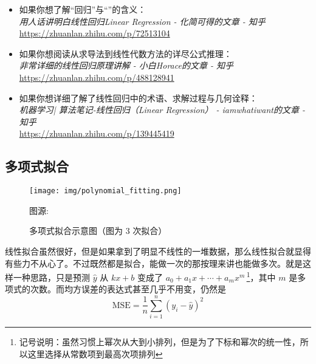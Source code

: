 \begin{tcolorbox}[myrecommendbox, title=推荐阅读, breakable=false]
    \begin{itemize}
        \item 如果你想了解“回归”与“”的含义：\\
              \textit{用人话讲明白线性回归Linear Regression - 化简可得的文章 - 知乎}\\
              \url{https://zhuanlan.zhihu.com/p/72513104}
        \item 如果你想阅读从求导法到线性代数方法的详尽公式推理：\\
              \textit{非常详细的线性回归原理讲解 - 小白Horace的文章 - 知乎}\\
              \url{https://zhuanlan.zhihu.com/p/488128941}
        \item 如果你想详细了解了线性回归中的术语、求解过程与几何诠释：\\
              \textit{机器学习| 算法笔记-线性回归（Linear Regression） - iamwhatiwant的文章 - 知乎}\\
              \url{https://zhuanlan.zhihu.com/p/139445419}
    \end{itemize}
\end{tcolorbox}

\newpage

\subsection{多项式拟合}

\begin{figure}[H]
    \centering
    \texttt{[image: img/polynomial\_fitting.png]}
    \caption{多项式拟合示意图（图为 3 次拟合）}
    {图源: }
    \label{fig:polynomial_fitting}
\end{figure}

线性拟合虽然很好，但是如果拿到了明显不线性的一堆数据，那么线性拟合就显得有些力不从心了。不过既然都是拟合，能做一次的那按理来讲也能做多次。就是这样一种思路，只是预测 $\hat y$ 从 $kx+b$ 变成了 $a_0 + a_1 x + \cdots + a_m x^m$\,\footnote{记号说明：虽然习惯上幂次从大到小排列，但是为了下标和幂次的统一性，所以这里选择从常数项到最高次项排列}，其中 $m$ 是多项式的次数。而均方误差的表达式甚至几乎不用变，仍然是
\[
    \text{MSE} = \frac1n \sum_{i=1}^n (y_i - \hat y)^2
\]

